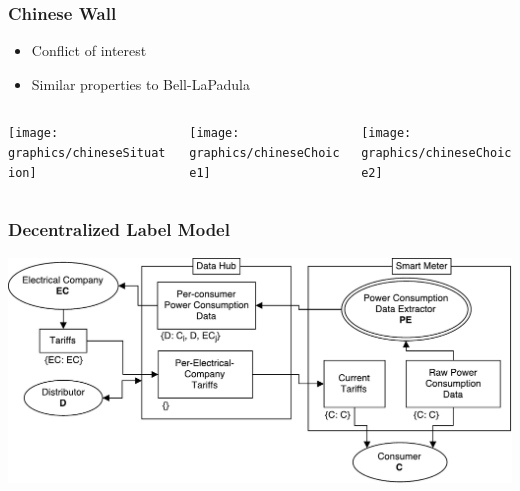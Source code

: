 \begin{frame}
  \frametitle{Chinese Wall}

  \begin{itemize}
    \item Conflict of interest
    \item Similar properties to Bell-LaPadula
  \end{itemize}
  \vfill
  \begin{columns}
    \begin{column}{.33\textwidth}
      \texttt{[image: graphics/chineseSituation]}
    \end{column}
    \begin{column}{.33\textwidth}
      \texttt{[image: graphics/chineseChoice1]}
    \end{column}
    \begin{column}{.33\textwidth}
      \texttt{[image: graphics/chineseChoice2]}
    \end{column}
  \end{columns}
\end{frame}

\begin{frame}
  \frametitle{Decentralized Label Model}

  \includegraphics[width=\textwidth]{graphics/dlm_sm_example}
\end{frame}
